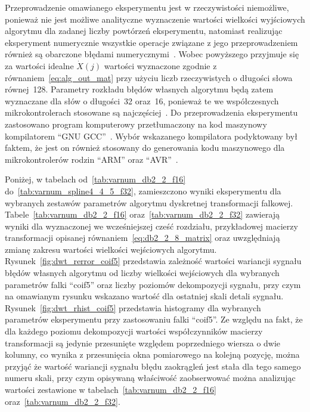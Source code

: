 Przeprowadzenie omawianego eksperymentu jest w rzeczywistości niemożliwe, ponieważ nie jest możliwe analityczne wyznaczenie wartości wielkości wyjściowych algorytmu dla zadanej liczby powtórzeń eksperymentu, natomiast realizując eksperyment numerycznie wszystkie operacje związane z jego przeprowadzeniem również są obarczone błędami numerycznymi~\cite{benz_floats}. Wobec powyższego przyjmuje się za wartości idealne $\dot{X}(j)$ wartości wyznaczone zgodnie z równaniem~\eqref{eq:alg_out_mat} przy użyciu liczb rzeczywistych o długości słowa równej~\qty{128}{\bitOw}. Parametry rozkładu błędów własnych algorytmu będą zatem wyznaczane dla słów o długości~\qty{32}{\bitOw} oraz~\qty{16}{\bitOw}, ponieważ te we współczesnych mikrokontrolerach stosowane są najczęściej~\cite{cortex_dsp, kim_compilers}. Do przeprowadzenia eksperymentu zastosowano program komputerowy przetłumaczony na kod maszynowy kompilatorem \enquote{GNU GCC}~\cite{gcc_manual}. Wybór wskazanego kompilatora podyktowany był faktem, że jest on również stosowany do generowania kodu maszynowego dla mikrokontrolerów rodzin \enquote{ARM} oraz \enquote{AVR}~\cite{kim_compilers, gcc_manual}.

Poniżej, w tabelach od~\ref{tab:varnum_db2_2_f16} do~\ref{tab:varnum_spline4_4_5_f32}, zamieszczono wyniki eksperymentu dla wybranych zestawów parametrów algorytmu dyskretnej transformacji falkowej. Tabele~\ref{tab:varnum_db2_2_f16} oraz~\ref{tab:varnum_db2_2_f32} zawierają wyniki dla wyznaczonej we wcześniejszej cześć rozdziału, przykładowej macierzy transformacji opisanej równaniem~\eqref{eq:db2_2_8_matrix} oraz uwzględniają zmianę zakresu wartości wielkości wejściowych algorytmu. Rysunek~\ref{fig:dwt_rerror_coif5} przedstawia zależność wartości wariancji sygnału błędów własnych algorytmu od liczby wielkości wejściowych dla wybranych parametrów falki \enquote{coif5} oraz liczby poziomów dekompozycji sygnału, przy czym na omawianym rysunku wskazano wartość dla ostatniej skali detali sygnału. Rysunek~\ref{fig:dwt_rhist_coif5} przedstawia histogramy dla wybranych parametrów eksperymentu przy zastosowaniu falki \enquote{coif5}. Ze względu na fakt, że dla każdego poziomu dekompozycji wartości współczynników macierzy transformacji są jedynie przesunięte względem poprzedniego wiersza o dwie kolumny, co wynika z przesunięcia okna pomiarowego na kolejną pozycję, można przyjąć że wartość wariancji sygnału błędu zaokrągleń jest stała dla tego samego numeru skali, przy czym opisywaną właściwość zaobserwować można analizując wartości zestawione w tabelach~\ref{tab:varnum_db2_2_f16} oraz~\ref{tab:varnum_db2_2_f32}.

